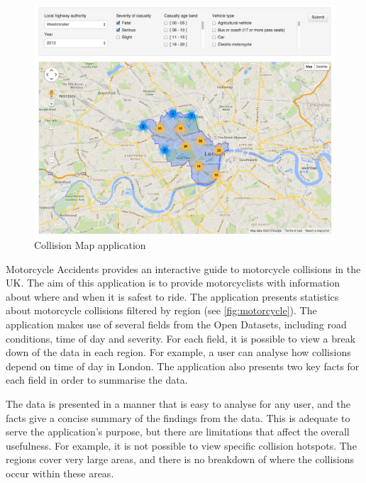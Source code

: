 \documentclass[authoryearcitations]{UoYCSproject}
\begin{document}
\begin{figure}
	\center
	\includegraphics[scale=0.3]{collisionmap}
	\caption{Collision Map application}
	\label{fig:collisionmap}
\end{figure}

Motorcycle Accidents \citep{Mceinsurance} provides an interactive guide to motorcycle collisions in the UK. The aim of this application is to provide motorcyclists with information about where and when it is safest to ride. The application presents statistics about motorcycle collisions filtered by region (see \autoref{fig:motorcycle}). The application makes use of several fields from the Open Datasets, including road conditions, time of day and severity. For each field, it is possible to view a break down of the data in each region. For example, a user can analyse how collisions depend on time of day in London. The application also presents two key facts for each field in order to summarise the data.

The data is presented in a manner that is easy to analyse for any user, and the facts give a concise summary of the findings from the data. This is adequate to serve the application's purpose, but there are limitations that affect the overall usefulness. For example, it is not possible to view specific collision hotspots. The regions cover very large areas, and there is no breakdown of where the collisions occur within these areas.
\end{document}
